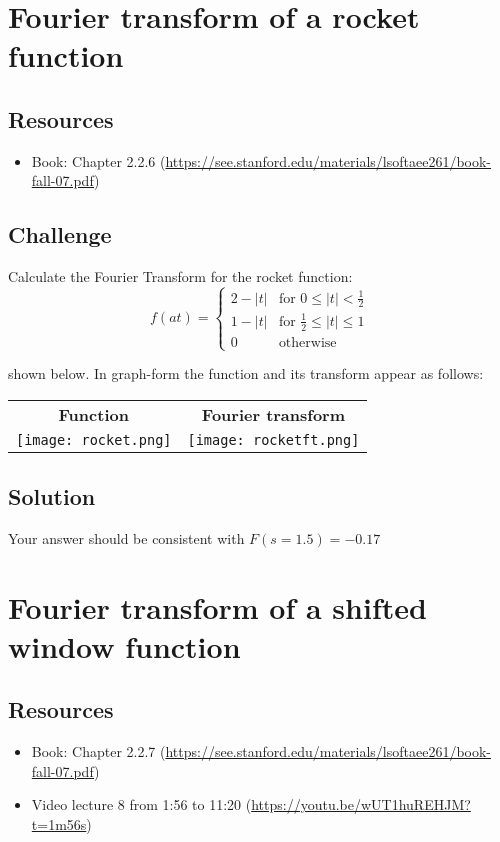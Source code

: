 \section{Fourier transform of a rocket function}

\subsection*{Resources}
\begin{itemize}
    \item Book: Chapter 2.2.6 (\url{https://see.stanford.edu/materials/lsoftaee261/book-fall-07.pdf})
\end{itemize}

\subsection*{Challenge}
Calculate the Fourier Transform for the rocket function:
\begin{equation}
    f(at)=
    \begin{cases}
        2 - |t| & \text{for } 0 \le |t| < \frac{1}{2}\\
        1 - |t| & \text{for } \frac{1}{2} \le |t| \le 1\\
        0 & \text{otherwise}
    \end{cases}
\end{equation}
    
shown below. In graph-form the function and its transform appear as follows:

\begin{tabular}{cc}
    \textbf{Function} & \textbf{Fourier transform} \\
    \texttt{[image: rocket.png]} & \texttt{[image: rocketft.png]}
\end{tabular}

\subsection*{Solution}
Your answer should be consistent with $F(s=1.5) = -0.17$




\newpage
\section{Fourier transform of a shifted window function}

\subsection*{Resources}
\begin{itemize}
    \item Book: Chapter 2.2.7 (\url{https://see.stanford.edu/materials/lsoftaee261/book-fall-07.pdf})
    \item Video lecture 8 from 1:56 to 11:20 (\url{https://youtu.be/wUT1huREHJM?t=1m56s})
\end{itemize}

